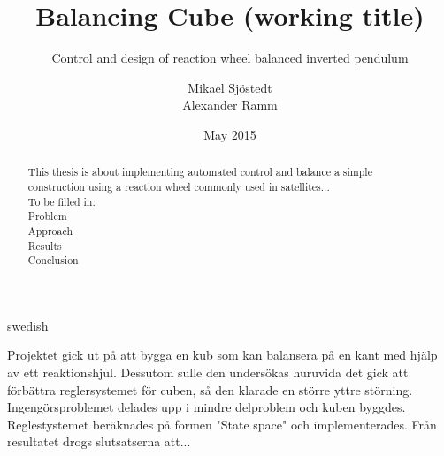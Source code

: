 \documentclass[a4paper,11pt]{kth-mag}
\title{Balancing Cube (working title)}
\subtitle{Control and design of reaction wheel balanced inverted pendulum}
\author{Mikael Sjöstedt \\ Alexander Ramm}
\date{May 2015}
\begin{document}
%
\clearpage

\frontmatter
\pagestyle{plain}
{}
\maketitle
{}
\begin{abstract}
This thesis is about implementing automated control and balance a simple construction using a reaction wheel commonly used in satellites...
\\ To be filled in:
\\	Problem
\\	Approach %
\\	Results
\\ 	Conclusion


\end{abstract}
\cleardoublepage
\begin{foreignabstract}{swedish}
Projektet gick ut på att bygga en kub som kan balansera på en kant med hjälp av ett reaktionshjul. Dessutom sulle den undersökas huruvida det gick att förbättra reglersystemet
för cuben, så den klarade en större yttre störning. Ingengörsproblemet delades upp i mindre delproblem och kuben byggdes. Reglestystemet beräknades på formen "State space" och implementerades.
Från resultatet drogs slutsatserna att...
\\


\end{foreignabstract}
\clearpage
\end{document}
